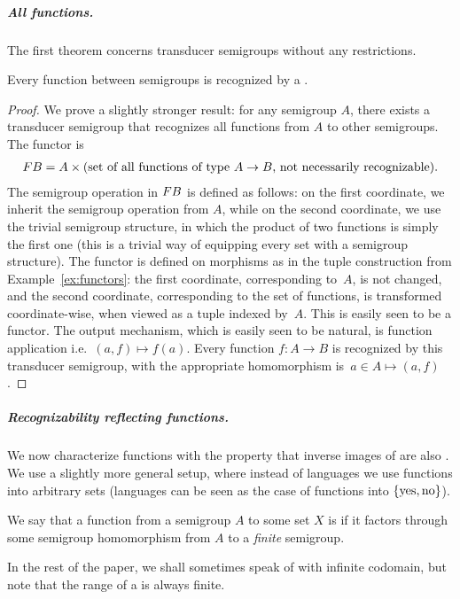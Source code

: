 \subparagraph{All functions.} The first theorem concerns transducer semigroups without any restrictions.

\begin{theorem}\label{thm:all-functions} 
 Every function between semigroups is recognized by a .
\end{theorem}
\begin{proof}
 We prove a slightly stronger result: for any semigroup $A$, there exists a transducer semigroup that recognizes all functions from $A$ to other semigroups. The functor is 
 \begin{align*}
 \functor B = A \times \text{(set of all functions of type $A \to B$, not necessarily recognizable)}.
 \end{align*}
 \AP The semigroup operation in $\functor B$ is defined as follows: on the first coordinate, we inherit the semigroup operation from $A$, while on the second coordinate, we use the trivial  semigroup structure, in which  the product of two functions is simply the first one (this is a trivial way of equipping every set with a semigroup structure). The functor is defined on morphisms
as in the tuple construction from Example~\ref{ex:functors}: the first coordinate, corresponding to~$A$, is not changed, and the second coordinate, corresponding to the set of functions, is transformed coordinate-wise, when viewed as a tuple indexed by~$A$. This is easily seen to be a functor. The output mechanism, which is easily seen to be natural, is function application i.e.~$(a,f) \mapsto f(a)$.
Every function $f\colon A \to B$ is recognized by this transducer semigroup, with the appropriate homomorphism is~$a \in A \mapsto (a,f)$.
\end{proof}

\subparagraph{Recognizability reflecting functions.} We now characterize
functions with the property that inverse images of  are
also . We use a slightly more general setup, where instead of
languages we use functions into arbitrary sets (languages can be seen as the
case of functions into $\{\text{yes},\text{no}\}$).

\begin{definition}
  We say that a function from a semigroup $A$ to some set $X$ is
   if it factors through some semigroup homomorphism from $A$
  to a \emph{finite} semigroup.
\end{definition}
In the rest of the paper, we shall sometimes
speak of  with infinite codomain, but note that the
range of a  is always finite.

